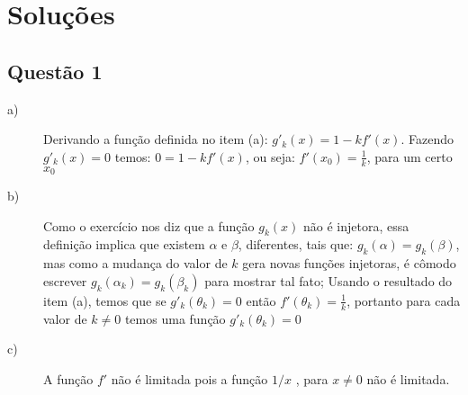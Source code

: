 \documentclass[12pt]{article}
\begin{document}
\section*{\color{red} Soluções}

\subsection*{\color{red} Questão 1}

\begin{description}

\item[a)] Derivando a função definida no item (a): $g'_k(x)=1-kf'(x)$. Fazendo $g'_k(x)=0$ temos: $0=1-kf'(x)$, ou seja: $f'(x_0)=\frac1{k}$, para um certo $x_0$

\item[b)] Como o exercício nos diz que a função $g_k(x)$ não é injetora, essa definição implica que existem $\alpha$ e $\beta$, diferentes, tais que: $g_k(\alpha)=g_k(\beta)$, mas como a mudança do valor de $k$ gera novas funções injetoras, é cômodo escrever $g_k(\alpha_k)=g_k(\beta_k)$ para mostrar tal fato; Usando o resultado do item (a), temos que se $g'_k(\theta_k)=0$ então $f'(\theta_k)=\frac1{k}$, portanto para cada valor de $k\neq 0$ temos uma função $g'_k(\theta_k)=0$

\item[c)] A função $f'$ não é limitada pois a função $1/x$ , para $x \neq 0$ não é limitada.

\end{description}
\end{document}
